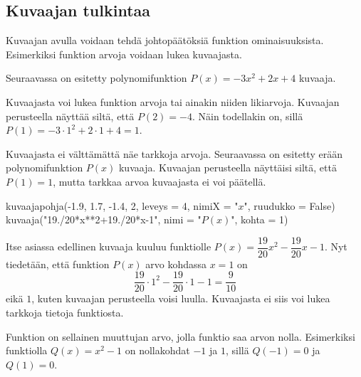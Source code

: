 \subsection*{Kuvaajan tulkintaa}


Kuvaajan avulla voidaan tehdä johtopäätöksiä funktion ominaisuuksista.
Esimerkiksi funktion arvoja voidaan lukea kuvaajasta.

\begin{esimerkki}
Seuraavassa on esitetty polynomifunktion $P(x)=-3x^2+2x+4$ kuvaaja.

\begin{kuvaajapohja}[\kuvaajaAsetusEiRuudukkoa]{0.7}{-3}{3}{-5}{5}
\end{kuvaajapohja}

Kuvaajasta voi lukea funktion arvoja tai ainakin niiden likiarvoja. Kuvaajan perusteella näyttää siltä, että $P(2)=-4$. Näin todellakin on, sillä $P(1)=-3\cdot 1^2+2\cdot 1+4=1$.
\end{esimerkki}


\begin{esimerkki}
Kuvaajasta ei välttämättä näe tarkkoja arvoja. Seuraavassa on esitetty erään polynomifunktion $P(x)$ kuvaaja. Kuvaajan perusteella näyttäisi siltä, että $P(1)=1$, mutta tarkkaa arvoa kuvaajasta ei voi päätellä.

\begin{kuva}
kuvaajapohja(-1.9, 1.7, -1.4, 2, leveys = 4, nimiX = "$x$", ruudukko = False)
kuvaaja("19./20*x**2+19./20*x-1", nimi = "$P(x)$", kohta = 1)
\end{kuva}
 
Itse asiassa edellinen kuvaaja kuuluu funktiolle $P(x)=\dfrac{19}{20} x^2-\dfrac{19}{20} x-1$. Nyt tiedetään, että funktion $P(x)$ arvo kohdassa $x=1$ on
$$\dfrac{19}{20}\cdot 1^2-\dfrac{19}{20} \cdot 1-1=\dfrac{9}{10}$$
eikä $1$, kuten kuvaajan perusteella voisi luulla. Kuvaajasta ei siis voi lukea tarkkoja tietoja funktiosta.
\end{esimerkki}

Funktion  on sellainen muuttujan arvo, jolla funktio saa arvon nolla. Esimerkiksi funktiolla $Q(x)=x^2-1$
on nollakohdat $-1$ ja $1$, sillä $Q(-1)=0$ ja $Q(1)=0$.

